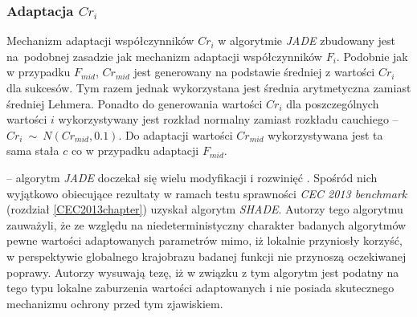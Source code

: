 \documentclass[12pt,a4paper]{report}
\begin{document}
{{{\begin{description}
\subsubsection{Adaptacja $Cr_i$}
\par{
Mechanizm adaptacji współczynników $Cr_i$ w algorytmie \emph{JADE} zbudowany jest na~podobnej zasadzie jak mechanizm adaptacji współczynników $F_i$. Podobnie jak w przypadku $F_{mid}$, $Cr_{mid}$ jest generowany na podstawie średniej z wartości $Cr_i$ dla sukcesów. Tym razem jednak wykorzystana jest średnia arytmetyczna zamiast średniej Lehmera. Ponadto do generowania wartości $Cr_i$ dla poszczególnych wartości $i$ wykorzystywany jest rozkład normalny zamiast rozkładu cauchiego -- \\ $Cr_i~\sim~N(Cr_{mid}, 0.1)$. Do adaptacji wartości $Cr_{mid}$ wykorzystywana jest ta sama stała $c$ co w przypadku adaptacji $F_{mid}$.
}
\item[SHADE]\cite{SHADE} -- algorytm \emph{JADE} doczekał się wielu modyfikacji i rozwinięć \cite{SHADE, JADEexMultiStart, zhang2009adaptive, JADEexOverviewNumerical, JADEexLargeScale, JADEDiscrette, JADE2}. Spośród nich wyjątkowo obiecujące rezultaty w ramach testu sprawności \emph{CEC 2013 benchmark} (rozdział \ref{CEC2013chapter}) uzyskał algorytm \emph{SHADE}. Autorzy tego algorytmu zauważyli, że ze względu na niedeterministyczny charakter badanych algorytmów pewne wartości adaptowanych parametrów mimo, iż lokalnie przyniosły korzyść, w perspektywie globalnego krajobrazu badanej funkcji nie przynoszą oczekiwanej poprawy. Autorzy wysuwają tezę, iż w związku z tym algorytm jest podatny na tego typu lokalne zaburzenia wartości adaptowanych i nie posiada skutecznego mechanizmu ochrony przed tym zjawiskiem.


\end{description}}}}
\end{document}
